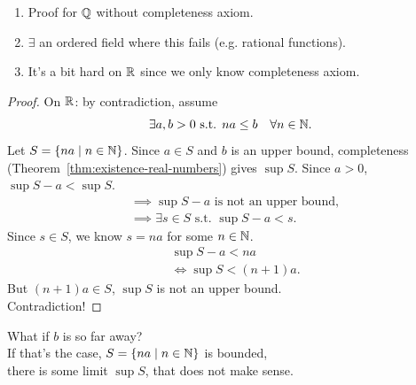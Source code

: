 \begin{note}
  \begin{enumerate}
    \item Proof for $\mathbb{Q}$ without completeness axiom.
    \item $\exists$ an ordered field where this fails
          (e.g. rational functions).
    \item It's a bit hard on $\mathbb{R}$ since we only know
          completeness axiom.
  \end{enumerate}
\end{note}

\begin{proof}
  On $\mathbb{R}$: by contradiction, assume
  \[
    \exists a,b>0\text{ s.t. }na\le b\quad\forall n\in\mathbb{N}.
  \]
  Let $S=\{na\mid n\in\mathbb{N}\}$. Since $a\in S$ and $b$ is an upper bound,
  completeness (Theorem~\ref{thm:existence-real-numbers}) gives $\sup S$.
  Since $a>0$, $\sup S-a<\sup S$.
  \begin{align*}
     & \implies\sup S-a\text{ is not an upper bound}, \\
     & \implies\exists s\in S\text{ s.t. }\sup S-a<s.
  \end{align*}
  Since $s\in S$, we know $s=na$ for some $n\in\mathbb{N}$.
  \begin{align*}
     & \sup S-a<na        \\
     & \iff\sup S<(n+1)a.
  \end{align*}
  But $(n+1)a\in S$, $\sup S$ is not an upper bound.\\
  Contradiction!
\end{proof}

\begin{thinking}
  What if $b$ is so far away?\\[0.5em]
  If that's the case, $S=\{na\mid n\in\mathbb{N}\}$ is bounded,\\
  there is some limit $\sup S$, that does not make sense.
  \begin{center}
  \end{center}
\end{thinking}

